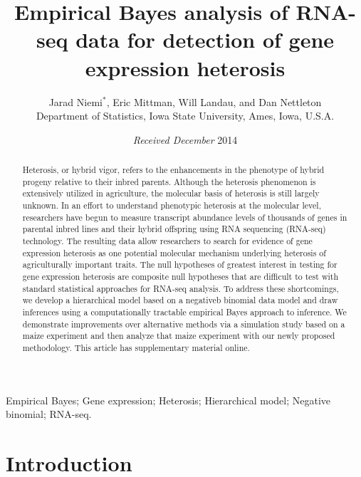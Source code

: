 \documentclass[useAMS,usenatbib,referee]{biom}
\title{Empirical Bayes analysis of RNA-seq data for detection of gene expression heterosis}
\author{Jarad Niemi$^*$\email{niemi@iastate.edu}, 
Eric Mittman, 
Will Landau, and 
Dan Nettleton \\
Department of Statistics, Iowa State University, Ames, Iowa, U.S.A.}
\begin{document}
\date{{\it Received December} 2014} 

\pagerange{\pageref{firstpage}--\pageref{lastpage}} 

\label{firstpage}

\begin{abstract}
Heterosis, or hybrid vigor, refers to the enhancements in the phenotype of hybrid progeny relative to their inbred parents. Although the heterosis phenomenon is extensively utilized in agriculture, the molecular basis of heterosis is still largely unknown. In an effort to understand phenotypic heterosis at the molecular level, researchers have begun to measure transcript abundance levels of thousands of genes in parental inbred lines and their hybrid offspring using RNA sequencing (RNA-seq) technology.  The resulting data allow researchers to search for evidence of gene expression heterosis as one potential molecular mechanism underlying heterosis of agriculturally important traits.  The null hypotheses of greatest interest in testing for gene expression heterosis are composite null hypotheses that are difficult to test with standard statistical approaches for RNA-seq analysis. To address these shortcomings, we develop a hierarchical model based on a negativeb binomial data model and draw inferences using a computationally tractable empirical Bayes approach to inference. We demonstrate improvements over alternative methods via a simulation study based on a maize experiment and then analyze that maize experiment with our newly proposed methodology. This article has supplementary material online.
\end{abstract}

\begin{keywords}
Empirical Bayes; Gene expression; Heterosis; Hierarchical model; Negative binomial; RNA-seq.
\end{keywords}

\maketitle


\section{Introduction}
\label{s:intro}
\end{document}
